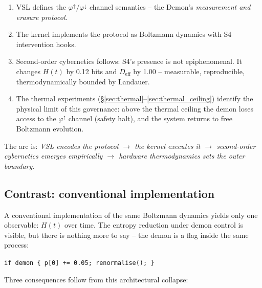 \documentclass[11pt, a4paper]{article}
\begin{document}
\begin{enumerate}
  \item VSL defines the $\varphi^\uparrow / \varphi^\downarrow$ channel
    semantics -- the Demon's \emph{measurement and erasure protocol}.
  \item The kernel implements the protocol as Boltzmann dynamics with
    S4 intervention hooks.
  \item Second-order cybernetics follows: S4's presence is not epiphenomenal.
    It changes $H(t)$ by 0.12 bits and $D_\text{eff}$ by 1.00 -- measurable,
    reproducible, thermodynamically bounded by Landauer.
  \item The thermal experiments (\S\ref{sec:thermal}--\ref{sec:thermal_ceiling})
    identify the physical limit of this governance: above the thermal ceiling
    the demon loses access to the $\varphi^\uparrow$ channel (safety halt),
    and the system returns to free Boltzmann evolution.
\end{enumerate}

The arc is: \emph{VSL encodes the protocol $\to$ the kernel executes it $\to$
second-order cybernetics emerges empirically $\to$ hardware thermodynamics sets
the outer boundary}.

\subsection{Contrast: conventional implementation}

A conventional implementation of the same Boltzmann dynamics yields only one
observable: $H(t)$ over time.
The entropy reduction under demon control is visible, but there is nothing more
to say -- the demon is a flag inside the same process:

\begin{center}
\texttt{if demon \{ p[0] += 0.05; renormalise(); \}}
\end{center}

Three consequences follow from this architectural collapse:
\end{document}
